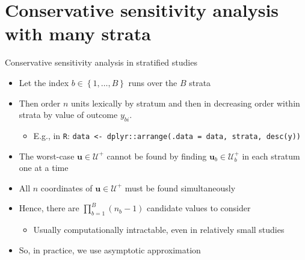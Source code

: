 \documentclass[table, xcolor={dvipsnames}, 9pt]{beamer}
\theoremstyle{newstyle}
\begin{document}
\section{Conservative sensitivity analysis with many strata}
\begin{frame}{Conservative sensitivity analysis in stratified studies}
\vfill
\begin{itemize} \vfill
\item Let the index $b \in \left\{1, \ldots, B\right\}$ runs over the $B$ strata \vfill
\item  Then order $n$ units lexically by stratum and then in decreasing order within strata by value of outcome $y_{bi}$.
\begin{itemize} \vfill
\item  E.g., in \texttt{R}: \texttt{data <- dplyr::arrange(.data = data, strata, desc(y))} \vfill
\end{itemize}  \vfill
\item  The worst-case $\mathbf{u} \in \mathcal{U}^+$ cannot be found by finding $\mathbf{u}_b \in \mathcal{U}_b^+$ in each stratum one at a time \vfill
\item  All $n$ coordinates of $\mathbf{u} \in \mathcal{U}^+$ must be found simultaneously \vfill
\item  Hence, there are $\prod \limits_{b = 1}^B \left(n_b - 1\right)$ candidate values to consider \vfill
\begin{itemize} \vfill
\item  Usually computationally intractable, even in relatively small studies  \vfill
\end{itemize} \vfill
\item So, in practice, we use asymptotic approximation \\ \citep{gastwirthetal2000,rosenbaum2018} \vfill
\end{itemize} \vfill
\end{frame}
\end{document}
